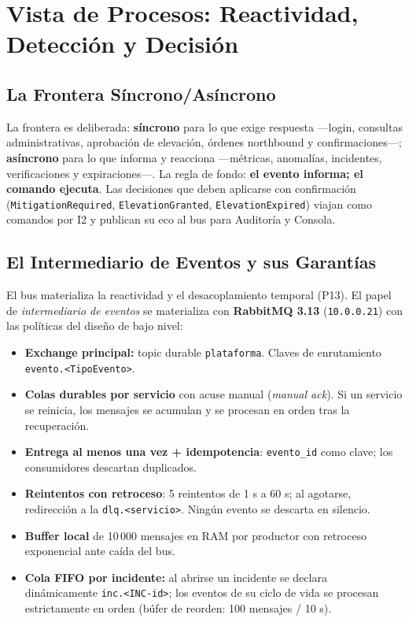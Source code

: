 \documentclass[11pt,a4paper]{report}
\begin{document}
\chapter{Vista de Procesos: Reactividad, Detección y Decisión}

\section{La Frontera Síncrono/Asíncrono}
La frontera es deliberada: \textbf{síncrono} para lo que exige respuesta —login, consultas administrativas, aprobación de elevación, órdenes northbound y confirmaciones—; \textbf{asíncrono} para lo que informa y reacciona —métricas, anomalías, incidentes, verificaciones y expiraciones—. La regla de fondo: \textbf{el evento informa; el comando ejecuta}. Las decisiones que deben aplicarse con confirmación (\texttt{MitigationRequired}, \texttt{ElevationGranted}, \texttt{ElevationExpired}) viajan como comandos por I2 y publican su eco al bus para Auditoría y Consola.

\section{El Intermediario de Eventos y sus Garantías}
El bus materializa la reactividad y el desacoplamiento temporal (P13). El papel de \emph{intermediario de eventos} se materializa con \textbf{RabbitMQ 3.13} (\texttt{10.0.0.21}) con las políticas del diseño de bajo nivel:
\begin{itemize}[leftmargin=*]
    \item \textbf{Exchange principal:} topic durable \texttt{plataforma}. Claves de enrutamiento \texttt{evento.<TipoEvento>}.
    \item \textbf{Colas durables por servicio} con acuse manual (\emph{manual ack}). Si un servicio se reinicia, los mensajes se acumulan y se procesan en orden tras la recuperación.
    \item \textbf{Entrega al menos una vez + idempotencia}: \texttt{evento\_id} como clave; los consumidores descartan duplicados.
    \item \textbf{Reintentos con retroceso}: 5 reintentos de 1 s a 60 s; al agotarse, redirección a la \texttt{dlq.<servicio>}. Ningún evento se descarta en silencio.
    \item \textbf{Buffer local} de 10\,000 mensajes en RAM por productor con retroceso exponencial ante caída del bus.
    \item \textbf{Cola FIFO por incidente:} al abrirse un incidente se declara dinámicamente \texttt{inc.<INC-id>}; los eventos de su ciclo de vida se procesan estrictamente en orden (búfer de reorden: 100 mensajes / 10 s).
\end{itemize}
\end{document}
